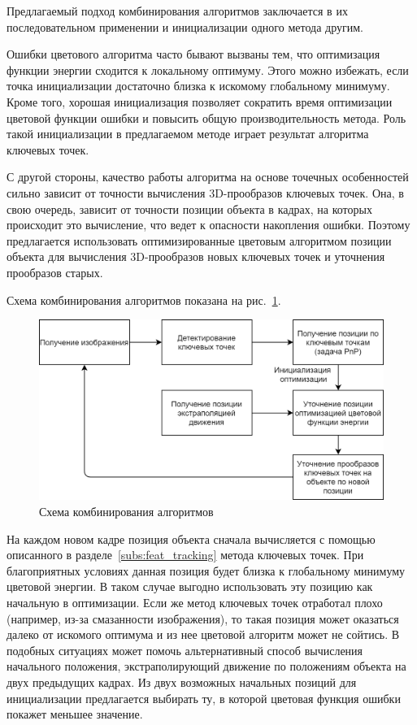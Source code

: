 Предлагаемый подход комбинирования алгоритмов заключается в их последовательном
применении и инициализации одного метода другим.

Ошибки цветового алгоритма часто бывают вызваны тем, что оптимизация функции
энергии сходится к локальному оптимуму.
Этого можно избежать, если точка инициализации достаточно близка к искомому
глобальному минимуму.
Кроме того, хорошая инициализация позволяет сократить время оптимизации
цветовой функции ошибки и повысить общую производительность метода.
Роль такой инициализации в предлагаемом методе играет результат алгоритма
ключевых точек.

С другой стороны, качество работы алгоритма на основе точечных особенностей
сильно зависит от точности вычисления 3D-прообразов ключевых точек.
Она, в свою очередь, зависит от точности позиции объекта в кадрах, на которых
происходит это вычисление, что ведет к опасности накопления ошибки.
Поэтому предлагается использовать оптимизированные цветовым алгоритмом позиции
объекта для вычисления 3D-прообразов новых ключевых точек и уточнения
прообразов старых.

\newcommand{\XOld}{\ensuremath{\xvec_{\text {\it old}}}}
\newcommand{\XNew}{\ensuremath{\xvec_{\text{\it new}}}}
\newcommand{\ReprErr}[1]{\ensuremath{\vect{e}( #1 )}}

Схема комбинирования алгоритмов показана на рис.~\ref{fig:combining_schema}.

\begin{figure}[t]
    \centering
    \includegraphics[width=\textwidth]{fig/combining_schema.png}
    \caption{
        Схема комбинирования алгоритмов
    }
    \label{fig:combining_schema}
\end{figure}

На каждом новом кадре позиция объекта сначала вычисляется с помощью
описанного в разделе~\ref{subs:feat_tracking} метода ключевых точек.
При благоприятных условиях данная позиция будет близка к глобальному минимуму
цветовой энергии.
В таком случае выгодно использовать эту позицию как начальную в оптимизации.
Если же метод ключевых точек отработал плохо (например, из-за смазанности
изображения), то такая позиция может оказаться далеко от искомого оптимума и
из нее цветовой алгоритм может не сойтись.
В подобных ситуациях может помочь альтернативный способ вычисления начального
положения, экстраполирующий движение по положениям объекта на двух предыдущих
кадрах.
Из двух возможных начальных позиций для инициализации предлагается выбирать ту,
в которой цветовая функция ошибки покажет меньшее значение.

